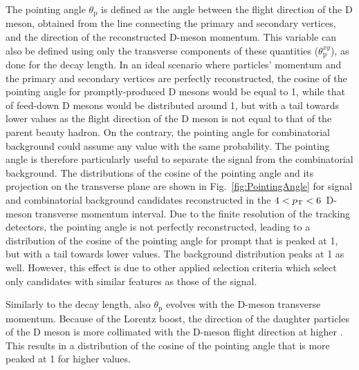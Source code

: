 The pointing angle $\theta_\mathrm{p}$ is defined as the angle between the flight direction of the D meson, obtained from the line connecting the primary and secondary vertices, and the direction of the reconstructed D-meson momentum. This variable can also be defined using only the transverse components of these quantities ($\theta_\mathrm{p}^{xy}$), as done for the decay length. In an ideal scenario where particles' momentum and the primary and secondary vertices are perfectly reconstructed, the cosine of the pointing angle for promptly-produced D mesons would be equal to 1, while that of feed-down D mesons would be distributed around 1, but with a tail towards lower values as the flight direction of the D meson is not equal to that of the parent beauty hadron. On the contrary, the pointing angle for combinatorial background could assume any value with the same probability. The pointing angle is therefore particularly useful to separate the signal from the combinatorial background. The distributions of the cosine of the pointing angle and its projection on the transverse plane are shown in Fig.~\ref{fig:PointingAngle} for signal and combinatorial background candidates reconstructed in the $4 < p_\mathrm{T} < 6$~\gevc D-meson transverse momentum interval. Due to the finite resolution of the tracking detectors, the pointing angle is not perfectly reconstructed, leading to a distribution of the cosine of the pointing angle for prompt \ds that is peaked at 1, but with a tail towards lower values. The background distribution peaks at 1 as well. However, this effect is due to other applied selection criteria which select only candidates with similar features as those of the signal. 

Similarly to the decay length, also $\theta_\mathrm{p}$ evolves with the D-meson transverse momentum. Because of the Lorentz boost, the direction of the daughter particles of the D meson is more collimated with the D-meson flight direction at higher \pt. This results in a distribution of the cosine of the pointing angle that is more peaked at 1 for higher \pt values.

